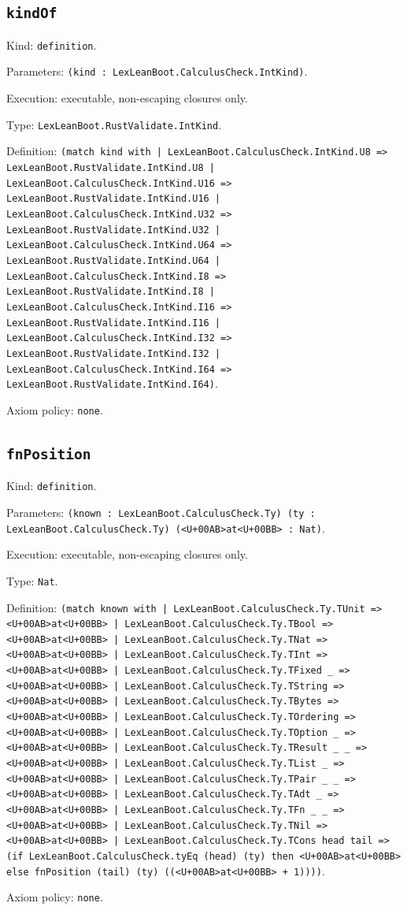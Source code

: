 \documentclass[11pt]{article}
\begin{document}
\subsection*{\texttt{kindOf}}
\noindent Kind: \texttt{definition}.\par
\noindent Parameters: \texttt{(kind : LexLeanBoot.CalculusCheck.IntKind)}.\par
\noindent Execution: executable, non-escaping closures only.\par
\noindent Type: \texttt{LexLeanBoot.RustValidate.IntKind}.\par
\noindent Definition: \texttt{(match kind with | LexLeanBoot.CalculusCheck.IntKind.U8 => LexLeanBoot.RustValidate.IntKind.U8 | LexLeanBoot.CalculusCheck.IntKind.U16 => LexLeanBoot.RustValidate.IntKind.U16 | LexLeanBoot.CalculusCheck.IntKind.U32 => LexLeanBoot.RustValidate.IntKind.U32 | LexLeanBoot.CalculusCheck.IntKind.U64 => LexLeanBoot.RustValidate.IntKind.U64 | LexLeanBoot.CalculusCheck.IntKind.I8 => LexLeanBoot.RustValidate.IntKind.I8 | LexLeanBoot.CalculusCheck.IntKind.I16 => LexLeanBoot.RustValidate.IntKind.I16 | LexLeanBoot.CalculusCheck.IntKind.I32 => LexLeanBoot.RustValidate.IntKind.I32 | LexLeanBoot.CalculusCheck.IntKind.I64 => LexLeanBoot.RustValidate.IntKind.I64)}.\par
\noindent Axiom policy: \texttt{none}.\par
\subsection*{\texttt{fnPosition}}
\noindent Kind: \texttt{definition}.\par
\noindent Parameters: \texttt{(known : LexLeanBoot.CalculusCheck.Ty) (ty : LexLeanBoot.CalculusCheck.Ty) (<U+00AB>at<U+00BB> : Nat)}.\par
\noindent Execution: executable, non-escaping closures only.\par
\noindent Type: \texttt{Nat}.\par
\noindent Definition: \texttt{(match known with | LexLeanBoot.CalculusCheck.Ty.TUnit => <U+00AB>at<U+00BB> | LexLeanBoot.CalculusCheck.Ty.TBool => <U+00AB>at<U+00BB> | LexLeanBoot.CalculusCheck.Ty.TNat => <U+00AB>at<U+00BB> | LexLeanBoot.CalculusCheck.Ty.TInt => <U+00AB>at<U+00BB> | LexLeanBoot.CalculusCheck.Ty.TFixed \_ => <U+00AB>at<U+00BB> | LexLeanBoot.CalculusCheck.Ty.TString => <U+00AB>at<U+00BB> | LexLeanBoot.CalculusCheck.Ty.TBytes => <U+00AB>at<U+00BB> | LexLeanBoot.CalculusCheck.Ty.TOrdering => <U+00AB>at<U+00BB> | LexLeanBoot.CalculusCheck.Ty.TOption \_ => <U+00AB>at<U+00BB> | LexLeanBoot.CalculusCheck.Ty.TResult \_ \_ => <U+00AB>at<U+00BB> | LexLeanBoot.CalculusCheck.Ty.TList \_ => <U+00AB>at<U+00BB> | LexLeanBoot.CalculusCheck.Ty.TPair \_ \_ => <U+00AB>at<U+00BB> | LexLeanBoot.CalculusCheck.Ty.TAdt \_ => <U+00AB>at<U+00BB> | LexLeanBoot.CalculusCheck.Ty.TFn \_ \_ => <U+00AB>at<U+00BB> | LexLeanBoot.CalculusCheck.Ty.TNil => <U+00AB>at<U+00BB> | LexLeanBoot.CalculusCheck.Ty.TCons head tail => (if LexLeanBoot.CalculusCheck.tyEq (head) (ty) then <U+00AB>at<U+00BB> else fnPosition (tail) (ty) ((<U+00AB>at<U+00BB> + 1))))}.\par
\noindent Axiom policy: \texttt{none}.\par
\end{document}

